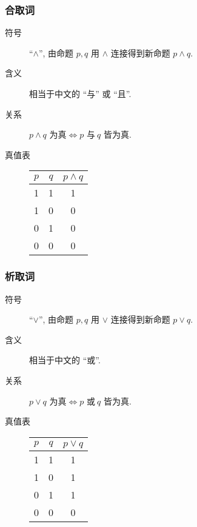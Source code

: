 \documentclass[
    mode=hazy,
    color=blue,
    device=normal,
    lang=cn
]{elegantnote}
\begin{document}
            \subsubsection{合取词}
                \begin{description}
                    \item[符号] ``$\land$'', 由命题 $p,q$ 用 $\land$ 连接得到新命题 $p\land q$.
                    \item[含义] 相当于中文的 ``与'' 或 ``且''.
                    \item[关系] $p\land q\text{ 为真}\Leftrightarrow p\text{ 与}\ q\text{ 皆为真}$.
                    \item[真值表]
                    \begin{tabular}{c|c|c}
                        $p$ & $q$ & $p\land q$\\
                        \hline
                        1 & 1 & 1\\
                        1 & 0 & 0\\
                        0 & 1 & 0\\
                        0 & 0 & 0
                    \end{tabular}    
                \end{description}
            \subsubsection{析取词}
                \begin{description}
                    \item[符号] ``$\lor$'', 由命题 $p,q$ 用 $\lor$ 连接得到新命题 $p\lor q$.
                    \item[含义] 相当于中文的 ``或''.
                    \item[关系] $p\lor q\text{ 为真}\Leftrightarrow p\text{ 或}\ q\text{ 皆为真}$.
                    \item[真值表]
                    \begin{tabular}{c|c|c}
                        $p$ & $q$ & $p\lor q$\\
                        \hline
                        1 & 1 & 1\\
                        1 & 0 & 1\\
                        0 & 1 & 1\\
                        0 & 0 & 0
                    \end{tabular}    
                \end{description}
\end{document}
